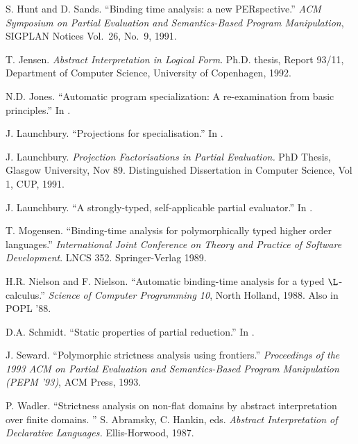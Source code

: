 \begin{thebibliography}{123456}
S. Hunt and D. Sands.
``Binding time analysis:  a new PERspective.''
{\it ACM Symposium on Partial Evaluation
and Semantics-Based Program Manipulation},
SIGPLAN Notices Vol.\ 26, No.\ 9, 1991.

T. Jensen.
{\it Abstract Interpretation in Logical Form}.
Ph.D. thesis, Report 93/11, Department of Computer Science,
University of Copenhagen, 1992.

N.D. Jones.
``Automatic program specialization: A re-examination from
basic principles.'' In \cite{BEJ88}.

J. Launchbury.
``Projections for specialisation.''
In \cite{BEJ88}.

J. Launchbury. 
{\it Projection Factorisations in Partial Evaluation.} PhD
Thesis, Glasgow University, Nov 89. Distinguished Dissertation in
Computer Science, Vol 1, CUP, 1991.

J. Launchbury.
``A strongly-typed, self-applicable partial evaluator.''
In \cite{Hug91}.

T. Mogensen.
``Binding-time analysis for polymorphically typed higher order languages.''
{\it International Joint Conference on Theory and Practice of Software
Development}. LNCS 352. Springer-Verlag 1989.

H.R. Nielson and F. Nielson.
``Automatic binding-time analysis for a typed $\L$-calculus.''
{\it Science of Computer Programming 10},
North Holland, 1988.  Also in POPL '88.

D.A. Schmidt.
``Static properties of partial reduction.''
In \cite{BEJ88}.

J. Seward.
``Polymorphic strictness analysis using frontiers.''
{\it Proceedings of the 1993 ACM on Partial Evaluation and
Semantics-Based Program Manipulation (PEPM '93)},
ACM Press, 1993.

P. Wadler.
``Strictness analysis on non-flat domains by abstract interpretation over finite domains. '' 
S. Abramsky, C. Hankin, eds.
{\it Abstract Interpretation of Declarative Languages.}
Ellis-Horwood, 1987.


\end{thebibliography}





